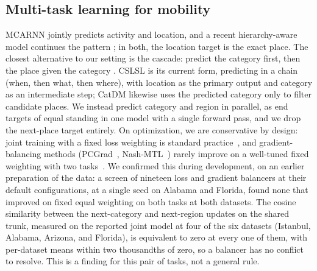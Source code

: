 \subsection{Multi-task learning for mobility}
\label{sec:related-mtl}
MCARNN \cite{Liao2018} jointly predicts activity and
location, and a recent hierarchy-aware model continues the
pattern \cite{wang2025hamtl}; in both, the location target is
the exact place. The closest alternative to our setting is
the cascade: predict the category first, then the place given the
category \cite{ye2013nextmove}. CSLSL
\cite{huang2024cslsl} is its current form, predicting in a chain (when, then what,
then where), with location as the primary output and category as an
intermediate step; CatDM \cite{yu2020catdm} likewise uses the predicted
category only to filter candidate places. We instead predict
category and region in parallel, as end targets of equal standing in one model
with a single forward pass, and we drop the next-place target entirely. On optimization, we are conservative by design: joint training with a fixed loss weighting is
standard practice~\cite{caruana1997multitask}, and gradient-balancing methods (PCGrad~\cite{yu2020pcgrad}, Nash-MTL~\cite{navon2022nashmtl})
rarely improve on a well-tuned fixed weighting with two tasks~\cite{xin2022domtl}. We confirmed
this during development, on an earlier preparation of the data: a screen of nineteen loss and
gradient balancers at their default configurations, at a single seed on Alabama and Florida, found
none that improved on fixed equal weighting on both tasks at both datasets.  The cosine similarity between the next-category and next-region updates on the
shared trunk, measured on the reported joint model at four of the six datasets (Istanbul, Alabama,
Arizona, and Florida), is equivalent to zero at every one of them, with per-dataset means within
two thousandths of zero, so a balancer has no conflict to resolve. This is a finding for this pair
of tasks, not a general rule.
